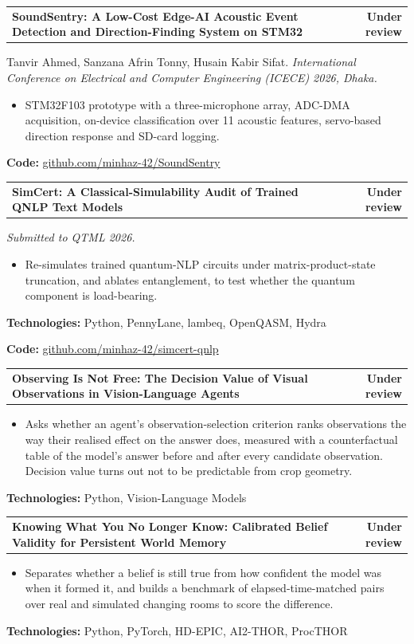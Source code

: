 \documentclass[10pt,letterpaper]{article}
\makeatletter
\newcommand{\entryhead}[2]{\par\needspace{4\baselineskip}\vspace{4pt}\noindent%
  \begin{tabular*}{\textwidth}[t]{@{}>{\raggedright\arraybackslash}p{0.72\textwidth}@{\extracolsep{\fill}}r@{}}
    \textbf{#1} & #2
  \end{tabular*}\par\vspace{1pt}}
\newcommand{\entry}[2]{\entryhead{#1}{\textbf{#2}}}
\newcommand{\tech}[1]{\par\vspace{2pt}\noindent\textbf{Technologies:} #1\par}
\newcommand{\code}[1]{\par\vspace{2pt}\noindent\textbf{Code:} #1\par}
\newcommand{\gap}{\par\vspace{7pt}}
\makeatother
\begin{document}
\entry{SoundSentry: A Low-Cost Edge-AI Acoustic Event Detection and Direction-Finding System on STM32}{Under review}
Tanvir Ahmed, Sanzana Afrin Tonny, Husain Kabir Sifat. \textit{International Conference on
Electrical and Computer Engineering (ICECE) 2026, Dhaka.}
\begin{itemize}
  \item STM32F103 prototype with a three-microphone array, ADC-DMA acquisition, on-device
    classification over 11 acoustic features, servo-based direction response and SD-card logging.
\end{itemize}
\code{\href{https://github.com/minhaz-42/SoundSentry-Acoustic-Surveillance-Direction-Finding-System}{github.com/minhaz-42/SoundSentry}}
\gap

\entry{SimCert: A Classical-Simulability Audit of Trained QNLP Text Models}{Under review}
\textit{Submitted to QTML 2026.}
\begin{itemize}
  \item Re-simulates trained quantum-NLP circuits under matrix-product-state truncation, and
    ablates entanglement, to test whether the quantum component is load-bearing.
\end{itemize}
\tech{Python, PennyLane, lambeq, OpenQASM, Hydra}
\code{\href{https://github.com/minhaz-42/simcert-qnlp}{github.com/minhaz-42/simcert-qnlp}}
\gap

\entry{Observing Is Not Free: The Decision Value of Visual Observations in Vision-Language Agents}{Under review}
\begin{itemize}
  \item Asks whether an agent's observation-selection criterion ranks observations the way their
    realised effect on the answer does, measured with a counterfactual table of the model's answer
    before and after every candidate observation. Decision value turns out not to be predictable
    from crop geometry.
\end{itemize}
\tech{Python, Vision-Language Models}
\gap

\entry{Knowing What You No Longer Know: Calibrated Belief Validity for Persistent World Memory}{Under review}
\begin{itemize}
  \item Separates whether a belief is still true from how confident the model was when it formed
    it, and builds a benchmark of elapsed-time-matched pairs over real and simulated changing rooms
    to score the difference.
\end{itemize}
\tech{Python, PyTorch, HD-EPIC, AI2-THOR, ProcTHOR}
\gap
\end{document}
